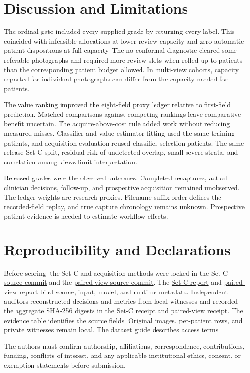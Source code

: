 \documentclass[conference]{IEEEtran}
\newcommand{\evidencelink}[2]{%
  \href{https://github.com/Riteshhai/Retina-Opthalmology/blob/a6b4b2b05ff87071f2c0682de78c398e0691a1a3/#1}{#2}}
\begin{document}
\section{Discussion and Limitations}
The ordinal gate included every supplied grade by returning every label.
This coincided with infeasible allocations at lower review capacity and
zero automatic patient dispositions at full capacity. The no-conformal
diagnostic cleared some referable photographs and required more review
slots when rolled up to patients than the corresponding patient budget
allowed. In multi-view cohorts, capacity reported for individual photographs
can differ from the capacity needed for patients.

The value ranking improved the eight-field proxy ledger relative to
first-field prediction. Matched comparisons against competing rankings
leave comparative benefit uncertain. The acquire-above-cost rule added
work without reducing measured misses. Classifier and value-estimator
fitting used the same training patients, and acquisition evaluation reused
classifier selection patients. The same-release Set-C split, residual risk
of undetected overlap, small severe strata, and correlation among views
limit interpretation.

Released grades were the observed outcomes. Completed recaptures, actual
clinician decisions, follow-up, and prospective acquisition remained
unobserved. The ledger weights are research proxies. Filename suffix order
defines the recorded-field replay, and true capture chronology remains
unknown. Prospective patient evidence is needed to estimate workflow effects.

\section{Reproducibility and Declarations}
Before scoring, the Set-C and acquisition methods were locked in the
\href{https://github.com/Riteshhai/Retina-Opthalmology/commit/eafd13db260bde7ed3627252d027e0cfc2ad2582}{Set-C source commit}
and the
\href{https://github.com/Riteshhai/Retina-Opthalmology/commit/6017d0c889d539b9d8c74ab33907015388040acf}{paired-view source commit}.
The \evidencelink{reports/set_c_validation_v1/evaluation.json}{Set-C report} and
\evidencelink{reports/paired_view_v1/evaluation.json}{paired-view report}
bind source, input, model, and runtime metadata. Independent auditors
reconstructed decisions and metrics from local witnesses and recorded the
aggregate SHA-256 digests in the
\evidencelink{reports/set_c_validation_v1/independent_audit.json}{Set-C receipt}
and
\evidencelink{reports/paired_view_v1/independent_audit.json}{paired-view receipt}.
The \evidencelink{docs/research/QSART_X_EVIDENCE_TABLE.md}{evidence table}
identifies the source fields. Original images, per-patient rows, and private
witnesses remain local. The
\evidencelink{docs/QSART_X_DATASETS.md}{dataset guide} describes access terms.

The authors must confirm authorship, affiliations, correspondence,
contributions, funding, conflicts of interest, and any applicable
institutional ethics, consent, or exemption statements before submission.



\end{document}
